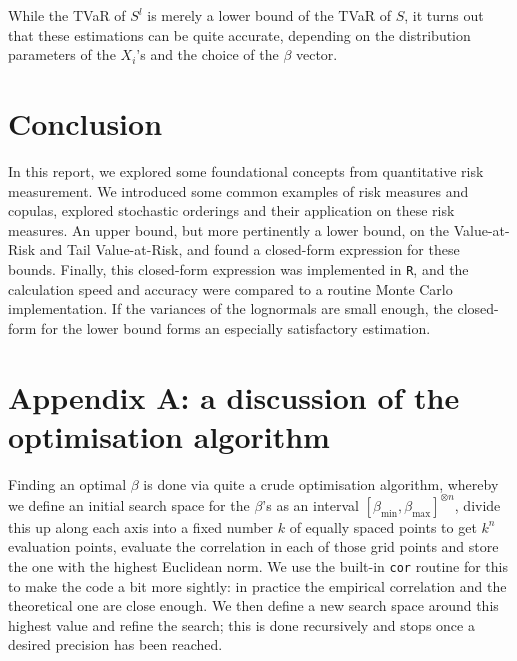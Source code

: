 \documentclass{article}
\begin{document}
While the TVaR of $S^l$ is merely a lower bound of the TVaR of $S$, it turns out that these estimations can be quite accurate, depending on the distribution parameters of the $X_i$'s and the choice of the $\beta$ vector.

\section{Conclusion}

In this report, we explored some foundational concepts from quantitative risk measurement. We introduced some common examples of risk measures and copulas, explored stochastic orderings and their application on these risk measures. An upper bound, but more pertinently a lower bound, on the Value-at-Risk and Tail Value-at-Risk, and found a closed-form expression for these bounds. Finally, this closed-form expression was implemented in \texttt{R}, and the calculation speed and accuracy were compared to a routine Monte Carlo implementation. If the variances of the lognormals are small enough, the closed-form for the lower bound forms an especially satisfactory estimation.

\printbibliography

\newpage
\section*{Appendix A: a discussion of the optimisation algorithm}
Finding an optimal $\beta$ is done via quite a crude optimisation algorithm, whereby we define an initial search space for the $\beta$'s as an interval $[\beta_\text{min}, \beta_\text{max}]^{\otimes n}$, divide this up along each axis into a fixed number $k$ of equally spaced points to get $k^n$ evaluation points, evaluate the correlation in each of those grid points and store the one with the highest Euclidean norm. We use the built-in \texttt{cor} routine for this to make the code a bit more sightly: in practice the empirical correlation and the theoretical one are close enough. We then define a new search space around this highest value and refine the search; this is done recursively and stops once a desired precision has been reached.
\end{document}
